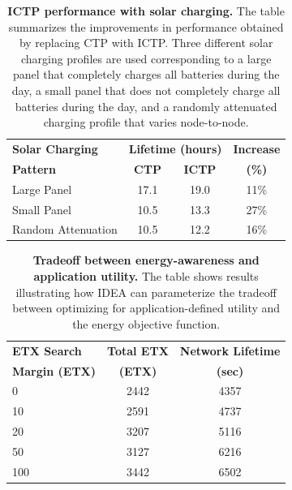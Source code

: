 \begin{table}[t]
\begin{center}
\begin{tabular}{|l|ccc|}
\hline
\textbf{Solar Charging} & \multicolumn{2}{c}{\textbf{Lifetime (hours)}} & \textbf{Increase} \\
\textbf{Pattern} & \textbf{CTP} & \textbf{ICTP} & \textbf{(\%)} \\ \hline
Large Panel & 17.1 & 19.0 & 11\% \\
Small Panel & 10.5 & 13.3 & 27\% \\
Random Attenuation & 10.5 & 12.2 & 16\% \\ \hline
\end{tabular}
\end{center}

\caption{\textbf{ICTP performance with solar charging.} The table summarizes
the improvements in performance obtained by replacing CTP with ICTP. Three
different solar charging profiles are used corresponding to a large panel
that completely charges all batteries during the day, a small panel that does
not completely charge all batteries during the day, and a randomly attenuated
charging profile that varies node-to-node.}

\label{idea-table-ictpvoptimaltossim}
\end{table}

\begin{table}[t]
\begin{center}
\begin{tabular}{|l|cc|}
\hline
\textbf{ETX Search} & \textbf{Total ETX} & \textbf{Network Lifetime} \\
\textbf{Margin (ETX)} & \textbf{(ETX)} & \textbf{(sec)} \\ \hline
0 & 2442 & 4357 \\
10 & 2591 & 4737 \\
20 & 3207 & 5116 \\
50 & 3127 & 6216 \\
100 & 3442 & 6502 \\ \hline
\end{tabular}
\end{center}

\caption{\textbf{Tradeoff between energy-awareness and application utility.}
The table shows results illustrating how IDEA can parameterize the tradeoff
between optimizing for application-defined utility and the energy objective
function.}

\label{idea-table-etxsearchradius}
\end{table}


